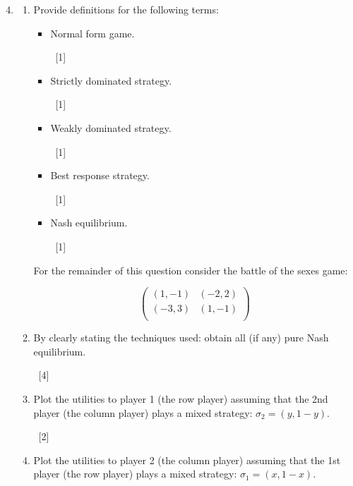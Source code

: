 \documentclass[12pt,a4paper]{article}
\renewcommand{\labelenumi}{\arabic{enumi}} %
\begin{document}
\null \vskip1cm
\begin{enumerate}
\setcounter{enumi}{3}

\renewcommand\labelenumi{\bfseries\theenumi.}

\item

    \begin{enumerate}
        \item Provide definitions for the following terms:
            \begin{itemize}
                \item Normal form game.

                ~\hfill{[1]}

                \item Strictly dominated strategy.

                ~\hfill{[1]}

                \item Weakly dominated strategy.

                ~\hfill{[1]}

                \item Best response strategy.

                ~\hfill{[1]}

                \item Nash equilibrium.

                ~\hfill{[1]}
            \end{itemize}

        For the remainder of this question consider the battle of the sexes game:

            \[\begin{pmatrix}
            (1,-1) & (-2,2)\\
            (-3,3) & (1,-1)\\
            \end{pmatrix}\]

        \item By clearly stating the techniques used: obtain all (if any) pure Nash equilibrium.

        ~\hfill{[4]}

        \item Plot the utilities to player 1 (the row player) assuming that the 2nd player (the column player) plays a mixed strategy: $\sigma_2 = (y,1-y)$.

        ~\hfill{[2]}

        \item Plot the utilities to player 2 (the column player) assuming that the 1st player (the row player) plays a mixed strategy: $\sigma_1 = (x,1-x)$.


\end{enumerate}
\end{enumerate}
\end{document}
